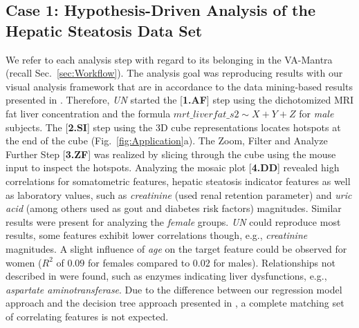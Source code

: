 \documentclass[journal]{style/vgtc} 			          %
\newcommand{\com}[1]{\textcolor{orange}{\uline{#1}}}
\begin{document}
\subsection{Case 1: Hypothesis-Driven Analysis of the Hepatic Steatosis Data Set}
We refer to each analysis step with regard to its belonging in the VA-Mantra (recall Sec.~\ref{sec:Workflow}).
The analysis goal was reproducing results with our visual analysis framework that are in accordance to the data mining-based results presented in \cite{Niemann2014}.
Therefore, \emph{UN} started the [\textbf{1.AF}] step using the dichotomized MRI fat liver concentration and the formula $mrt\_liverfat\_s2 \sim X + Y + Z$ for \emph{male} subjects.
The [\textbf{2.SI}] step using the 3D cube representations locates hotspots at the end of the cube (Fig.~\ref{fig:Application}a).
The Zoom, Filter and Analyze Further Step [\textbf{3.ZF}] was realized by slicing through the cube using the mouse input to inspect the hotspots.
Analyzing the mosaic plot [\textbf{4.DD}] revealed high correlations for somatometric features, hepatic steatosis indicator features as well as laboratory values, such as \emph{creatinine} (used renal retention parameter) and \emph{uric acid} (among others used as gout and diabetes risk factors) magnitudes.
Similar results were present for analyzing the \emph{female} groups.
\emph{UN} could reproduce most results, some features exhibit lower correlations though, e.g., \emph{creatinine} magnitudes.
A slight influence of \emph{age} on the target feature could be observed for women ($R^2$ of $0.09$ for females compared to $0.02$ for males).
Relationships not described in \cite{Niemann2014} were found, such as enzymes indicating liver dysfunctions, e.g., \emph{aspartate aminotransferase}.
%
Due to the difference between our regression model approach and the decision tree approach presented in \cite{Niemann2014}, a complete matching set of correlating features is not expected.
\end{document}
